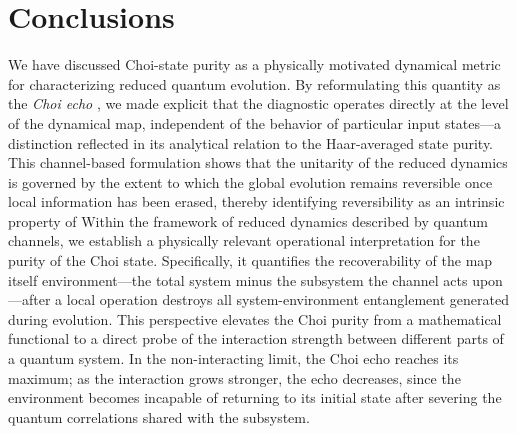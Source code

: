 \documentclass[pra,twocolumn,aps,showpacs,superscriptaddress,longbibliography]{revtex4-2}%
\providecommand{\DIFadd}[1]{{\protect\color{blue} \sf #1}} %
\providecommand{\DIFdel}[1]{{\protect\color{red} \scriptsize #1}} %
\providecommand{\DIFaddbegin}{} %
\providecommand{\DIFaddend}{} %
\providecommand{\DIFdelbegin}{} %
\providecommand{\DIFdelend}{} %
\begin{document}
\DIFdelend \section{Conclusions}\label{sec:conclusions}
\DIFdelbegin \DIFdel{We have discussed Choi-state purity as a physically motivated dynamical metric for characterizing reduced quantum evolution. 
By reformulating this quantity as the }\textit{\DIFdel{Choi echo}}%
\DIFdel{, we made explicit that the diagnostic operates directly at the level of the dynamical map, independent of the behavior of particular input states—a distinction reflected in its analytical relation to the Haar-averaged state purity. This channel-based formulation shows that the unitarity of the reduced dynamics is governed by the extent to which the global evolution remains reversible once local information has been erased, thereby identifying reversibility as an intrinsic property of }\DIFdelend \DIFaddbegin \DIFadd{Within the framework of reduced dynamics described by quantum channels, we establish a physically relevant operational interpretation for the purity of the Choi state. Specifically, it quantifies the recoverability of }\DIFaddend the \DIFdelbegin \DIFdel{map itself}\DIFdelend \DIFaddbegin \DIFadd{environment---the total system minus the subsystem the channel acts upon---after a local operation destroys all system-environment entanglement generated during evolution. This perspective elevates the Choi purity from a mathematical functional to a direct probe of the interaction strength between different parts of a quantum system. In the non-interacting limit, the Choi echo reaches its maximum; as the interaction grows stronger, the echo decreases, since the environment becomes incapable of returning to its initial state after severing the quantum correlations shared with the subsystem}\DIFaddend .
\end{document}
